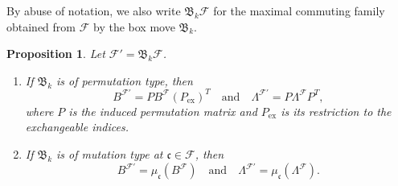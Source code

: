 \documentclass[12pt, leqno]{amsart}
\numberwithin{equation}{section}
\theoremstyle{plain}
\newtheorem{proposition}[lemma]{Proposition}
\theoremstyle{definition}
\newcommand{\ex}{\mathrm{ex}}
\newcommand{\frakB}{\mathfrak{B}}
\newcommand{\frakc}{\mathfrak{c}}
\newcommand{\calF}{\mathcal{F}}
\newcommand{\qtq}[1][{and}]{\quad\text{{#1}}\quad}
\newcommand{\ee}{\end{enumerate}}
\newcommand{\bna}{\begin{enumerate}[{\rm (a)}]}
\begin{document}
By abuse of notation, we also write $\frakB_k\calF$ for the maximal
commuting family obtained from $\calF$ by the box move $\frakB_k$.

\begin{proposition}\label{prop: ibox pair box move}
Let $\calF'=\frakB_k\calF$.
\bna
\item If $\frakB_k$ is of permutation type, then
\[
B^{\calF'} = P B^\calF (P_{\ex})^T \qtq \Lambda^{\calF'} = P\Lambda^\calF P^T,
\]
where $P$ is the induced permutation matrix and $P_{\ex}$ is its
restriction to the exchangeable indices.
\item If $\frakB_k$ is of mutation type at $\frakc\in\calF$, then
\[
B^{\calF'}=\mu_{\frakc}(B^\calF) \qtq \Lambda^{\calF'}=\mu_{\frakc}(\Lambda^\calF).
\]
\ee
\end{proposition}
\end{document}
